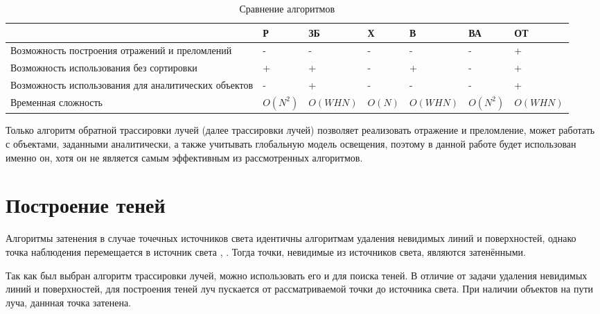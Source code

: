 \begin{table}[h]
	\begin{center}
        \small
		\caption{Сравнение алгоритмов}
		\label{tbl:comparing_algo}
		\begin{tabular}{
              |m{1.3in}|
              >{\centering\arraybackslash}m{0.7in}|
              >{\centering\arraybackslash}m{0.7in}|
              >{\centering\arraybackslash}m{0.7in}|
              >{\centering\arraybackslash}m{0.7in}|
              >{\centering\arraybackslash}m{0.7in}|
              >{\centering\arraybackslash}m{0.7in}|
              }
			 \hline
              & Р & ЗБ & Х & В & ВА & ОТ \\
             \hline
             Возможность построения отражений и преломлений & - & - & - & - & - & + \\
             \hline
             Возможность использования без сортировки & + & + & - & + & - & + \\
             \hline
             Возможность использования для аналитических объектов & - & + & - & - & - & + \\
             \hline
             Временная сложность & $O(N^2)$ & $O(WHN)$ & $O(N)$ & $O(WHN)$ & $O(N^2)$ & $O(WHN)$ \\
             \hline
		\end{tabular}
	\end{center}
\end{table}

Только алгоритм обратной трассировки лучей (далее трассировки лучей) позволяет реализовать отражение и преломление, может работать с объектами, заданными аналитически, а также учитывать глобальную модель освещения, поэтому в данной работе будет использован именно он, хотя он не является самым эффективным из рассмотренных алгоритмов.

\section{Построение теней}

Алгоритмы затенения в случае точечных источников света идентичны алгоритмам удаления невидимых линий и поверхностей, однако точка наблюдения перемещается в источник света \cite{crow1977shadow}, \cite{романюк2000алгоритмы}. Тогда точки, невидимые из источников света, являются затенёнными.

Так как был выбран алгоритм трассировки лучей, можно использовать его и для поиска теней. В отличие от задачи удаления невидимых линий и поверхностей, для построения теней луч пускается от рассматриваемой точки до источника света. При наличии объектов на пути луча, даннная точка затенена.

